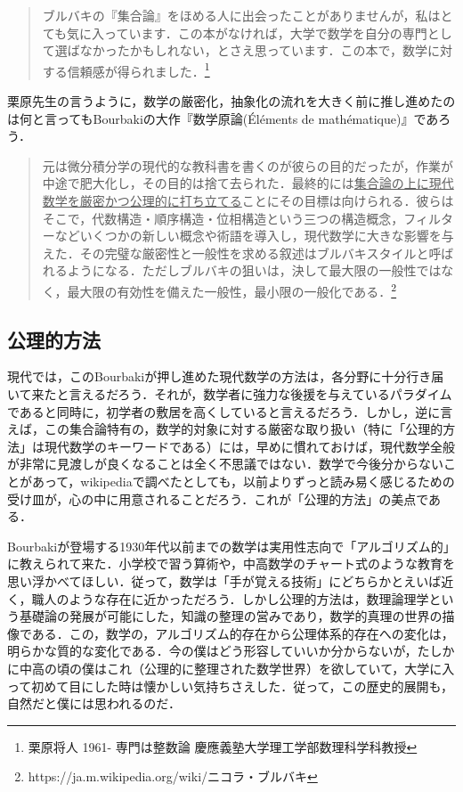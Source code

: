 \documentclass[uplatex, 12pt, a4paper, dvipdfmx]{jsreport}
\begin{document}
\begin{quote}
	ブルバキの『集合論』をほめる人に出会ったことがありませんが，私はとても気に入っています．この本がなければ，大学で数学を自分の専門として選ばなかったかもしれない，とさえ思っています．この本で，数学に対する信頼感が得られました．\footnote{栗原将人 1961- 専門は整数論 慶應義塾大学理工学部数理科学科教授}
\end{quote}

栗原先生の言うように，数学の厳密化，抽象化の流れを大きく前に推し進めたのは何と言ってもBourbakiの大作『数学原論(Éléments de mathématique)』であろう．

\begin{quote}
	元は微分積分学の現代的な教科書を書くのが彼らの目的だったが，作業が中途で肥大化し，その目的は捨て去られた．最終的には\underline{集合論の上に現代数学を厳密かつ公理的に打ち立てる}ことにその目標は向けられる．彼らはそこで，代数構造・順序構造・位相構造という三つの構造概念，フィルターなどいくつかの新しい概念や術語を導入し，現代数学に大きな影響を与えた．その完璧な厳密性と一般性を求める叙述はブルバキスタイルと呼ばれるようになる．ただしブルバキの狙いは，決して最大限の一般性ではなく，最大限の有効性を備えた一般性，最小限の一般化である．\footnote{https://ja.m.wikipedia.org/wiki/ニコラ・ブルバキ}
\end{quote}

\subsection{公理的方法}

現代では，このBourbakiが押し進めた現代数学の方法は，各分野に十分行き届いて来たと言えるだろう．それが，数学者に強力な後援を与えているパラダイムであると同時に，初学者の敷居を高くしていると言えるだろう．しかし，逆に言えば，この集合論特有の，数学的対象に対する厳密な取り扱い（特に「公理的方法」は現代数学のキーワードである）には，早めに慣れておけば，現代数学全般が非常に見渡しが良くなることは全く不思議ではない．数学で今後分からないことがあって，wikipediaで調べたとしても，以前よりずっと読み易く感じるための受け皿が，心の中に用意されることだろう．これが「公理的方法」の美点である．\par

Bourbakiが登場する1930年代以前までの数学は実用性志向で「アルゴリズム的」に教えられて来た．小学校で習う算術や，中高数学のチャート式のような教育を思い浮かべてほしい．従って，数学は「手が覚える技術」にどちらかとえいば近く，職人のような存在に近かっただろう．しかし公理的方法は，数理論理学という基礎論の発展が可能にした，知識の整理の営みであり，数学的真理の世界の描像である．この，数学の，アルゴリズム的存在から公理体系的存在への変化は，明らかな質的な変化である．今の僕はどう形容していいか分からないが，たしかに中高の頃の僕はこれ（公理的に整理された数学世界）を欲していて，大学に入って初めて目にした時は懐かしい気持ちさえした．従って，この歴史的展開も，自然だと僕には思われるのだ．\par
\end{document}
